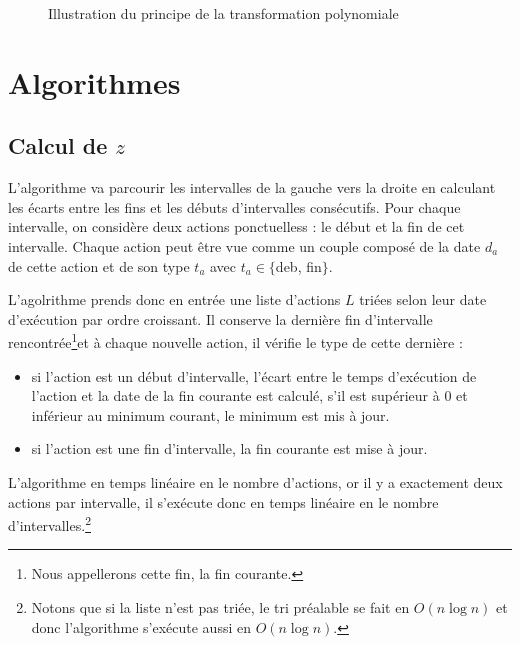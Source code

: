 \documentclass[a4paper,9pt]{report}
\begin{document}
\begin{ex}
\begin{figure}
\begin{center}
\begin{minipage}[c][5cm][c]{0.55\linewidth}
        \end{minipage}
    \end{center}
    \caption{Illustration du principe de la transformation polynomiale}
    \label{fig_transpoly_bis}
\end{figure}
\end{ex}

\newpage
\appendix
\chapter{Algorithmes}
\section{Calcul de $z$}
L'algorithme va parcourir les intervalles de la gauche vers la droite en calculant les écarts entre
les fins et les débuts d'intervalles consécutifs. Pour chaque intervalle, on considère deux
actions ponctuelless : le début et la fin de cet intervalle. Chaque action peut être vue comme un
couple composé de la date $d_a$ de cette action et de son type $t_a$ avec $t_a \in \{$deb, fin$\}$.

L'agolrithme prends donc en entrée une liste d'actions $L$ triées selon leur date d'exécution par ordre
croissant. Il conserve la dernière fin d'intervalle rencontrée\footnote{Nous appellerons cette fin,
la fin courante.}et à chaque nouvelle action, il vérifie le type de cette dernière :
\begin{itemize}
    \item si l'action est un début d'intervalle, l'écart entre le temps d'exécution de l'action et
        la date de la fin courante est calculé, s'il est supérieur à $0$ et inférieur au minimum
        courant, le minimum est mis à jour. 
    \item si l'action est une fin d'intervalle, la fin courante est mise à jour.
\end{itemize}

L'algorithme en temps linéaire en le nombre d'actions, or il y a exactement deux actions par
intervalle, il s'exécute donc en temps linéaire en le nombre d'intervalles.\footnote{Notons que si
    la liste n'est pas triée, le tri préalable se fait en $O(n \log n)$ et donc l'algorithme
s'exécute aussi en $O(n \log n)$.}
\end{document}
